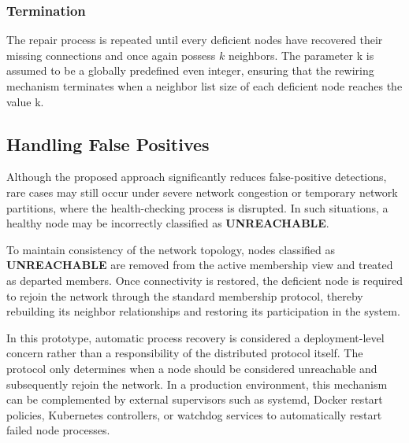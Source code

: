 \subsubsection{\textbf{Termination}}
\label{subsubsec: termination}
The repair process is repeated until every deficient nodes have recovered their missing connections and once
again possess $k$ neighbors. The parameter k is assumed to be a globally predefined even integer, ensuring
that the rewiring mechanism terminates when a neighbor list size of each deficient node reaches the value k.
\subsection{Handling False Positives}
\label{subsec:false_positives}
Although the proposed approach significantly reduces false-positive detections, rare cases may still occur
under severe network congestion or temporary network partitions, where the health-checking process is disrupted.
In such situations, a healthy node may be incorrectly classified as \textbf{UNREACHABLE}.

To maintain consistency of the network topology, nodes classified as \textbf{UNREACHABLE} are removed from the active
membership view and treated as departed members. Once connectivity is restored, the deficient node is required to
rejoin the network through the standard membership protocol, thereby rebuilding its neighbor relationships and
restoring its participation in the system.

In this prototype, automatic process recovery is considered a deployment-level concern rather than a responsibility of
the distributed protocol itself. The protocol only determines when a node should be considered unreachable and
subsequently rejoin the network. In a production environment, this mechanism can be complemented by external
supervisors such as systemd, Docker restart policies, Kubernetes controllers, or watchdog services to automatically
restart failed node processes.
